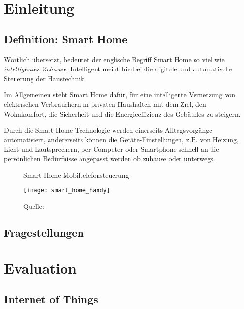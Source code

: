 \section{Einleitung}

\subsection{Definition: Smart Home} %

Wörtlich übersetzt, bedeutet der englische Begriff Smart Home so viel wie \textit{intelligentes Zuhause}. Intelligent meint hierbei die digitale und automatische Steuerung der Haustechnik.

Im Allgemeinen steht Smart Home dafür, für eine intelligente Vernetzung von elektrischen Verbrauchern in privaten Haushalten mit dem Ziel, den Wohnkomfort, die Sicherheit und die Energieeffizienz des Gebäudes zu steigern.

Durch die Smart Home Technologie werden einerseits Alltagsvorgänge automatisiert, andererseits können die Geräte-Einstellungen, z.B. von Heizung, Licht und Lautsprechern, per Computer oder Smartphone schnell an die persönlichen Bedürfnisse angepasst werden ob zuhause oder unterwegs.

\begin{figure}[ht] %
	\centering
	\caption{Smart Home Mobiltelefonsteuerung}
	\texttt{[image: smart\_home\_handy]}
	\caption*{\footnotesize{Quelle: }}
	\label{fig:smarthomehandy}
\end{figure}

\subsection{Fragestellungen} %


\section{Evaluation}

\subsection{Internet of Things} %

